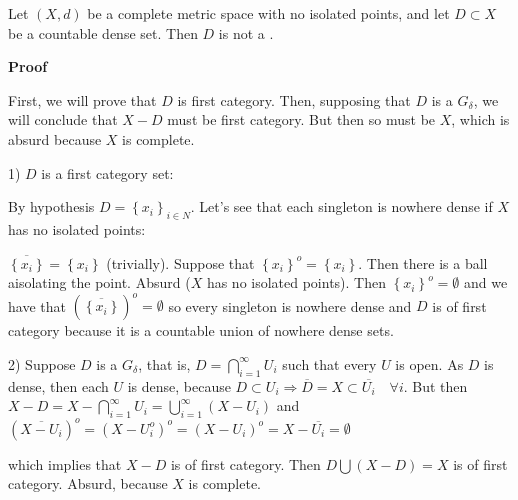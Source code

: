 \documentclass[12pt]{article}
\begin{document}
Let $(X,d)$ be a complete metric space with no isolated points, and let $D\subset X$ be a countable dense set. Then $D$ is not a
.

\textbf{Proof}

First, we will prove that $D$ is first category. Then, supposing that $D$ is a $G_\delta$, we will conclude that $X - D$ must be first category. But then so must be $X$, which is absurd because $X$ is complete.  

1) $D$ is a first category set:

By hypothesis $D=\left\{ {x_i } \right\}_{i\in N}$. Let's see that each singleton is nowhere dense if $X$ has no isolated points:

$\overline {\left\{ {x_i } \right\}} =\left\{ {x_i } \right\}$ (trivially). Suppose that $\left\{{x_i } \right\}^o=\left\{ {x_i } \right\}$. Then there is a ball aisolating the point. Absurd ($X$ has no isolated points). Then $\left\{ {x_i }\right\}^o=\emptyset$ and we have that $\left( {\overline {\left\{ {x_i } \right\}} }\right)^o=\emptyset$ so every singleton is nowhere dense and $D$ is of first category because it is a countable union of nowhere dense sets.

2) Suppose $D$ is a $G_\delta$, that is, $D=\bigcap\limits_{i=1}^\infty {U_i }$ such that every $U$ is open. As $D$ is dense, then each $U$ is dense, because $D\subset U_i \Rightarrow \overline D =X\subset \overline {U_i } \quad \forall i$. But then 
$X-D=X-\bigcap\limits_{i=1}^\infty {U_i } =\bigcup\limits_{i=1}^\infty {(X-U_i)
}$ and $\left( {\overline {X-U_i } } \right)^o=\left( {X-U_i ^o}
\right)^o=\left( {X-U_i } \right)^o=X-\overline {U_i } =\emptyset $

which implies that $X-D$ is of first category. Then $D\bigcup {(X-D)} = X $ is of first category. Absurd, because $X$ is complete.
\end{document}
